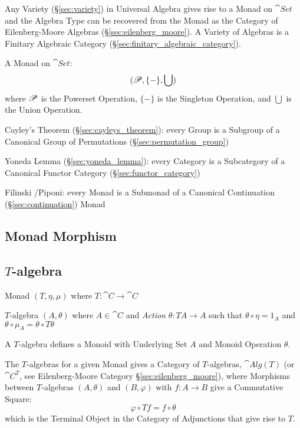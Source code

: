Any Variety (\S\ref{sec:variety}) in Universal Algebra gives rise to a
Monad on $\cat{Set}$ and the Algebra Type can be recovered from the
Monad as the Category of Eilenberg-Moore Algebras
(\S\ref{sec:eilenberg_moore}). A Variety of Algebras is a Finitary
Algebraic Category (\S\ref{sec:finitary_algebraic_category}).

A Monad on $\cat{Set}$:
\[
  (\mathscr{P}, \{-\}, \bigcup)
\]
where $\mathscr{P}$ is the Powerset Operation, $\{-\}$ is the
Singleton Operation, and $\bigcup$ is the Union Operation.


\asterism


Cayley's Theorem (\S\ref{sec:cayleys_theorem}): every Group is a
Subgroup of a Canonical Group of Permutations
(\S\ref{sec:permutation_group})

Yoneda Lemma (\S\ref{sec:yoneda_lemma}): every Category is a
Subcategory of a Canonical Functor Category
(\S\ref{sec:functor_category})

Filinski \cite{filinski99}/Piponi: every Monad is a Submonad of a
Canonical Continuation (\S\ref{sec:continuation}) Monad



\subsection{Monad Morphism}\label{sec:monad_morphism}

\subsection{$T$-algebra}\label{sec:t_algebra}

Monad $(T, \eta, \mu)$ where $T : \cat{C} \rightarrow \cat{C}$

$T$-algebra $(A, \theta)$ where $A \in \cat{C}$ and \emph{Action}
$\theta : T A \rightarrow A$ such that $\theta \circ \eta = 1_A$ and
$\theta \circ \mu_A = \theta \circ T \theta$

A $T$-algebra defines a Monoid with Underlying Set $A$ and Monoid
Operation $\theta$.

The $T$-algebras for a given Monad gives a Category of $T$-algebras,
$\cat{Alg}(T)$ (or $\cat{C}^T$, see Eilenberg-Moore Category
\S\ref{sec:eilenberg_moore}), where Morphisms between $T$-algebras
$(A, \theta)$ and $(B, \varphi)$ with $f : A \rightarrow B$ give a
Commutative Square:
\[
  \varphi \circ T f = f \circ \theta
\]
which is the Terminal Object in the Category of Adjunctions that give
rise to $T$.

